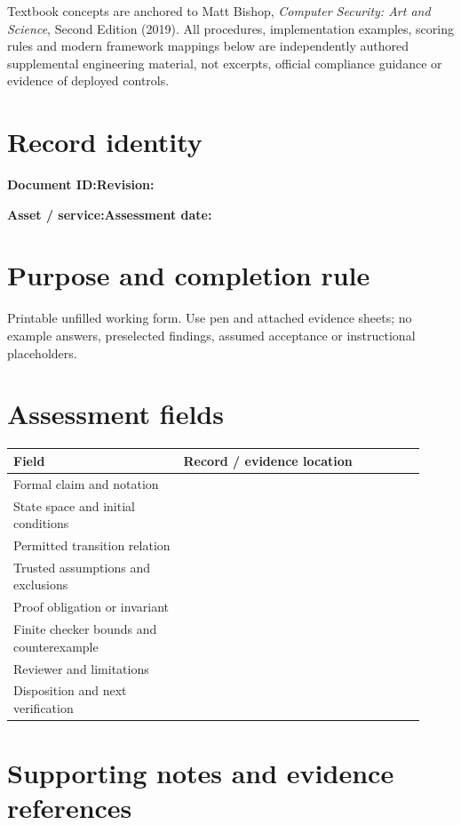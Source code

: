 \documentclass[10pt,letterpaper]{article}
\begin{document}
\makedoctocpage
\begin{notebox}
Textbook concepts are anchored to Matt Bishop, \emph{Computer Security: Art and Science}, Second Edition (2019). All procedures, implementation examples, scoring rules and modern framework mappings below are independently authored supplemental engineering material, not excerpts, official compliance guidance or evidence of deployed controls.
\end{notebox}
\section{Record identity}
\textbf{Document ID:}\enspace\hrulefill\quad\textbf{Revision:}\enspace\hrulefill
\par\medskip\textbf{Asset / service:}\enspace\hrulefill\quad\textbf{Assessment date:}\enspace\hrulefill
\section{Purpose and completion rule}
Printable unfilled working form. Use pen and attached evidence sheets; no example answers, preselected findings, assumed acceptance or instructional placeholders.
\section{Assessment fields}
\renewcommand{\arraystretch}{1.8}
\begin{longtable}{@{}p{0.38\linewidth}p{0.54\linewidth}@{}}
\toprule\textbf{Field}&\textbf{Record / evidence location}\\\midrule\endhead
Formal claim and notation & \rule{0pt}{1.3cm}\\\midrule
State space and initial conditions & \rule{0pt}{1.3cm}\\\midrule
Permitted transition relation & \rule{0pt}{1.3cm}\\\midrule
Trusted assumptions and exclusions & \rule{0pt}{1.3cm}\\\midrule
Proof obligation or invariant & \rule{0pt}{1.3cm}\\\midrule
Finite checker bounds and counterexample & \rule{0pt}{1.3cm}\\\midrule
Reviewer and limitations & \rule{0pt}{1.3cm}\\\midrule
Disposition and next verification & \rule{0pt}{1.3cm}\\\midrule
\bottomrule\end{longtable}
\section{Supporting notes and evidence references}
\end{document}
